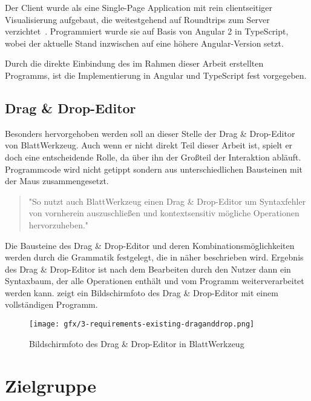 Der Client wurde als eine Single-Page Application mit rein clientseitiger Visualisierung aufgebaut, die weitestgehend auf Roundtrips zum Server verzichtet~\cite[94-95]{riemer2016}. Programmiert wurde sie auf Basis von Angular 2 in TypeScript, wobei der aktuelle Stand inzwischen auf eine höhere Angular-Version setzt.

Durch die direkte Einbindung des im Rahmen dieser Arbeit erstellten Programms, ist die Implementierung in Angular und TypeScript fest vorgegeben.

\subsection{Drag \& Drop-Editor}

Besonders hervorgehoben werden soll an dieser Stelle der Drag \& Drop-Editor von BlattWerkzeug. Auch wenn er nicht direkt Teil dieser Arbeit ist, spielt er doch eine entscheidende Rolle, da über ihn der Großteil der Interaktion abläuft. Programmcode wird nicht getippt sondern aus unterschiedlichen Bausteinen mit der Maus zusammengesetzt.

\begin{quote}
    "So nutzt auch BlattWerkzeug einen Drag \& Drop-Editor um Syntaxfehler von vornherein auszuschließen und kontextsensitiv mögliche Operationen hervorzuheben."~\cite[6]{riemer2016}
\end{quote}

Die Bausteine des Drag \& Drop-Editor und deren Kombinationsmöglichkeiten werden durch die Grammatik festgelegt, die in  näher beschrieben wird. Ergebnis des Drag \& Drop-Editor ist nach dem Bearbeiten durch den Nutzer dann ein Syntaxbaum, der alle Operationen enthält und vom Programm weiterverarbeitet werden kann.  zeigt ein Bildschirmfoto des Drag \& Drop-Editor mit einem vollständigen Programm.

\begin{figure}[h]
    \centering
    \texttt{[image: gfx/3-requirements-existing-draganddrop.png]}
    \caption{Bildschirmfoto des Drag \& Drop-Editor in BlattWerkzeug}
    \label{fig:requirements:existing:draganddrop}
\end{figure}

\section{Zielgruppe}
\label{sec:requirements:target}

